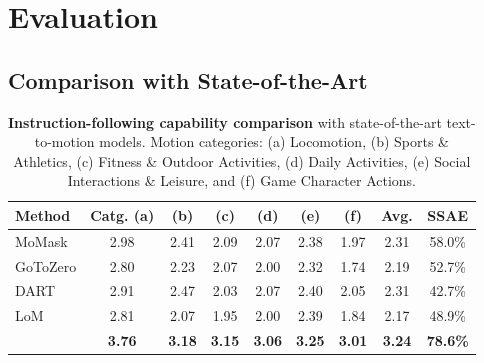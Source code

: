 \section{Evaluation}
\label{sec:eval}







\subsection{Comparison with State-of-the-Art}
\label{subsec:main_results}



\begin{table}[tb]
    \centering
    \caption{\textbf{Instruction-following capability comparison} with state-of-the-art text-to-motion models. Motion categories: (a) Locomotion, (b) Sports \& Athletics, (c) Fitness \& Outdoor Activities, (d) Daily Activities, (e) Social Interactions \& Leisure, and (f) Game Character Actions.}
    \vspace{5pt}
    \label{tab:sota_comparison}
    \begin{tabular}{l|cccccc|c|c}
        \toprule
        Method & Catg. (a) & (b) & (c) & (d) & (e) & (f) & Avg. & SSAE  \\
        \midrule
        MoMask \cite{momask} & 2.98 & 2.41 & 2.09 & 2.07 & 2.38 & 1.97 & 2.31 & 58.0\% \\
        GoToZero \cite{Fan_2025_ICCV} & 2.80 & 2.23 & 2.07 & 2.00 & 2.32 & 1.74 & 2.19 & 52.7\% \\
        DART \cite{DartControl} & 2.91 & 2.47 & 2.03 & 2.07 & 2.40 & 2.05 & 2.31  & 42.7\% \\
        LoM \cite{chen2024language} & 2.81 & 2.07 & 1.95 & 2.00 & 2.39 & 1.84 & 2.17  & 48.9\% \\
        \midrule
        \textbf{\modelname{}} & \textbf{3.76} & \textbf{3.18} & \textbf{3.15} & \textbf{3.06} & \textbf{3.25} & \textbf{3.01} & \textbf{3.24} & \textbf{78.6\%} \\
        \bottomrule
    \end{tabular}
    \vspace{-10pt}
\end{table}


